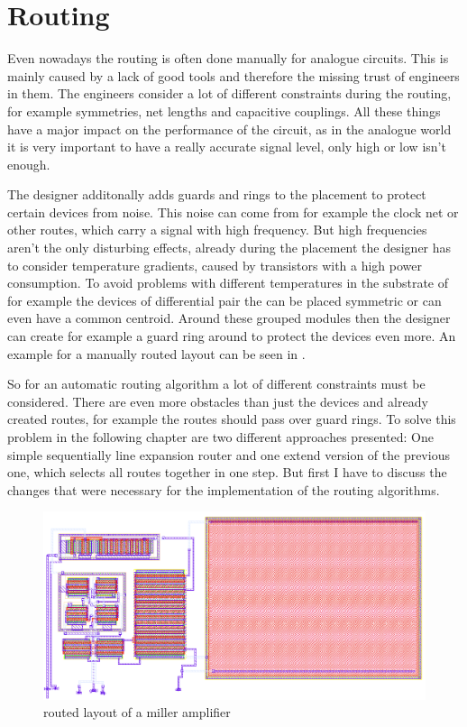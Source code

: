 \chapter{Routing}

Even nowadays the routing is often done manually for analogue circuits. This is mainly caused by a lack of good tools and therefore the missing trust of engineers in them. The engineers consider a lot of different constraints during the routing, for example symmetries, net lengths and capacitive couplings. All these things have a major impact on the performance of the circuit, as in the analogue world it is very important to have a really accurate signal level, only high or low isn't enough.

The designer additonally adds guards and rings to the placement to protect certain devices from noise. This noise can come from for example the clock net or other routes, which carry a signal with high frequency. But high frequencies aren't the only disturbing effects, already during the placement the designer has to consider temperature gradients, caused by transistors with a high power consumption. To avoid problems with different temperatures in the substrate of for example the devices of differential pair the can be placed symmetric or can even have a common centroid. Around these grouped modules then the designer can create for example a guard ring around to protect the devices even more. An example for a manually routed layout can be seen in .

So for an automatic routing algorithm a lot of different constraints must be considered. There are even more obstacles than just the devices and already created routes, for example the routes should pass over guard rings. To solve this problem in the following chapter are two different approaches presented: One simple sequentially line expansion router and one extend version of the previous one, which selects all routes together in one step. But first I have to discuss the changes that were necessary for the implementation of the routing algorithms.

\begin{figure}
	\centering
	\includegraphics[scale=.3]{FIG/miller_amplifier_layout_routed.png}
  	\caption{routed layout of a miller amplifier}
	\label{fig:miller_amplifier_routed_layout}
\end{figure}

